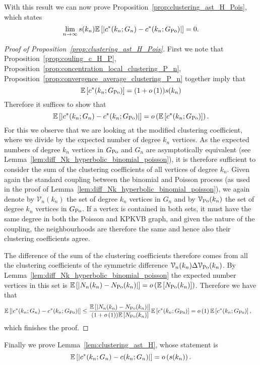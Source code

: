With this result we can now prove Proposition~\ref{prop:clustering_ast_H_Pois}, which states
\[
	\lim_{n \to \infty} s(k_n)\mathbb{E}\left[\left|c^\ast(k_n; G_n) - c^\ast(k_n; G_{\text{Po}})\right|\right] = 0.
\]

\begin{proof}[Proof of Proposition~\ref{prop:clustering_ast_H_Pois}]
First we note that Proposition~\ref{prop:couling_c_H_P}, Proposition~\ref{prop:concentration_local_clustering_P_n}, Proposition~\ref{prop:convergence_average_clustering_P_n} together imply that
\[
	\mathbb{E}\left[c^\ast(k_n; G_{\text{Po}})\right] = (1+o\left(1\right))s(k_n)
\]
Therefore it suffices to show that
\[
	\mathbb{E}\left[\left|c^\ast(k_n; G_n) - c^\ast(k_n; G_{\text{Po}})\right|\right] = o\left(\mathbb{E}\left[c^\ast(k_n; G_{\text{Po}})\right]\right).
\]
For this we observe that we are looking at the modified clustering coefficient, where we divide by the expected number of degree $k_n$ vertices. As the expected numbers of degree $k_n$ vertices in $G_{\text{Po}}$ and $G_n$ are asymptotically equivalent (see Lemma~\ref{lem:diff_Nk_hyperbolic_binomial_poisson}), it is therefore sufficient to consider the sum of the clustering coefficients of all vertices of degree $k_n$.
Given again the standard coupling between the binomial and Poisson process (as used in the proof of Lemma~\ref{lem:diff_Nk_hyperbolic_binomial_poisson}), we again denote by $\mathcal{V}_n(k_n)$ the set of degree $k_n$ vertices in $G_n$ and by $\mathcal{V}_{{\mathrm{Po}}}(k_n)$ the set of degree $k_n$ vertices in $G_{\text{Po}}$. If a vertex is contained in both sets, it must have the same degree in both the Poisson and KPKVB graph, and given the nature of the coupling, the neighbourhoods are therefore the same and hence also their clustering coefficients agree.

The difference of the sum of the clustering coefficients therefore comes from all the clustering coefficients of the symmetric difference $\mathcal{V}_n(k_n) \Delta \mathcal{V}_{{\mathrm{Po}}}(k_n)$. By Lemma~\ref{lem:diff_Nk_hyperbolic_binomial_poisson} the expected number vertices in this set is $\mathbb{E}\left[\left|N_{n}(k_n) - N_{{\mathrm{Po}}}(k_n)\right|\right] = o\left(\mathbb{E}\left[N_{{\mathrm{Po}}}(k_n)\right]\right)$. Therefore we have that
\begin{align*}
	\mathbb{E}\left[\left|c^\ast(k_n; G_n) - c^\ast(k_n; G_{\text{Po}})\right|\right]
	&\le \frac{\mathbb{E}\left[\left|N_{n}(k_n)-N_{{\mathrm{Po}}}(k_n)\right|\right]}{(1+o\left(1\right))\mathbb{E}\left[N_{{\mathrm{Po}}}(k_n)\right]} \mathbb{E}\left[c^\ast(k_n; G_{\text{Po}})\right]
	= o\left(1\right)\mathbb{E}\left[c^\ast(k_n; G_{\text{Po}})\right],
\end{align*}
which finishes the proof.
\end{proof}

Finally we prove Lemma~\ref{lem:clustering_ast_H}, whose statement is
\[
	\mathbb{E}\left[\left|c^\ast(k_n; G_n) - c(k_n; G_n)\right|\right] = o\left(s(k_n)\right).
\]


